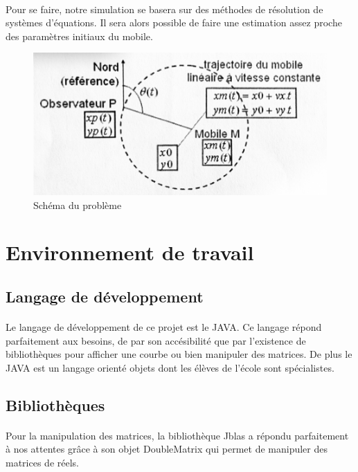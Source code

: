 \documentclass[a4paper,11pt]{article}
\begin{document}
		\paragraph{}
		Pour se faire, notre simulation se basera sur des méthodes de résolution de systèmes d'équations. Il sera alors possible de faire une estimation assez proche des paramètres initiaux du mobile.

		\begin{figure}[h]
			\centerline{\includegraphics[scale=0.50]{img/intro.png}}
			\caption{Schéma du problème}
			\label{diagramme-composants}
		\end{figure}


	\newpage

	\section{Environnement de travail}

		\subsection{Langage de développement}
		\paragraph{}
		Le langage de développement de ce projet est le JAVA. Ce langage répond parfaitement aux besoins, de par son accésibilité que par l'existence de bibliothèques pour afficher une courbe ou bien manipuler des matrices.
		De plus le JAVA est un langage orienté objets dont les élèves de l'école sont spécialistes.

		\subsection{Bibliothèques}
		\paragraph{}
		Pour la manipulation des matrices, la bibliothèque Jblas a répondu parfaitement à nos attentes grâce à son objet DoubleMatrix qui permet de manipuler des matrices de réels. 
\end{document}
